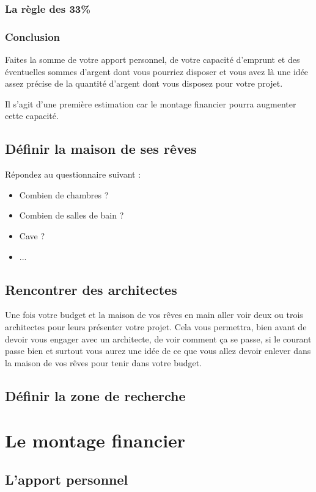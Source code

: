 \documentclass[french]{book}
\begin{document}
\subsection{La règle des 33\%}
\subsection{Conclusion}
Faites la somme de votre apport personnel, de votre capacité d'emprunt et des éventuelles sommes d'argent dont vous pourriez disposer et vous avez là une idée assez précise de la quantité d'argent dont vous disposez pour votre projet. 

Il s'agit d'une première estimation car le montage financier pourra augmenter cette capacité.

\section{Définir la maison de ses rêves}
Répondez au questionnaire suivant :
\begin{itemize}
    \item Combien de chambres ?
    \item Combien de salles de bain ?
    \item Cave ?
    \item ...
\end{itemize}

\section{Rencontrer des architectes}
Une fois votre budget et la maison de vos rêves en main aller voir deux ou trois architectes pour leurs présenter votre projet. Cela vous permettra, bien avant de devoir vous engager avec un architecte, de voir comment ça se passe, si le courant passe bien et surtout vous aurez une idée de ce que vous allez devoir enlever dans la maison de vos rêves pour tenir dans votre budget.

\section{Définir la zone de recherche}

\chapter{Le montage financier}
\section{L'apport personnel}
\end{document}
